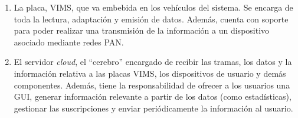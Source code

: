 \begin{enumerate}
  \item La placa, \ac{VIMS}, que va embebida en los vehículos del sistema. Se encarga
  de toda la lectura, adaptación y emisión de datos. Además, cuenta con soporte para
  poder realizar una transmisión de la información a un dispositivo asociado mediante
  redes \ac{PAN}.
  \item El servidor \textit{cloud}, el ``cerebro'' encargado de recibir las tramas,
  los datos y la información relativa a las placas \ac{VIMS}, los dispositivos de
  usuario y demás componentes. Además, tiene la responsabilidad de ofrecer a los
  usuarios una \ac{GUI}, generar información relevante a partir de los datos (como
  estadísticas), gestionar las suscripciones y enviar periódicamente la información
  al usuario.
\end{enumerate}
